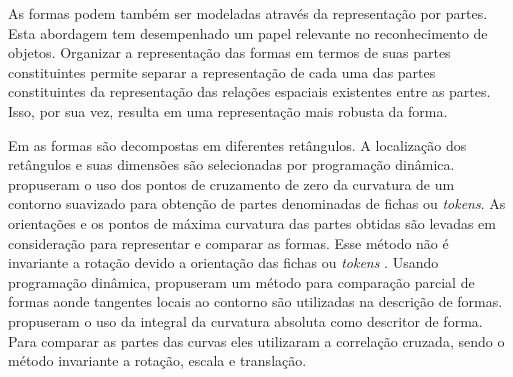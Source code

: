 As formas podem também ser modeladas através da representação por partes. Esta abordagem tem desempenhado um papel relevante no reconhecimento de objetos. Organizar a representação das formas em termos de suas partes constituintes permite separar a representação de cada uma das partes constituintes da representação das relações espaciais existentes entre as partes. Isso, por sua vez, resulta em uma representação mais robusta da forma. 

Em \cite{Kenji:1992} as formas são decompostas em diferentes retângulos. A localização dos retângulos e suas dimensões são selecionadas por programação dinâmica.  propuseram o uso dos pontos de cruzamento de zero da curvatura de um contorno suavizado para obtenção de partes denominadas de fichas ou \textit{tokens}. As orientações e os pontos de máxima curvatura das partes obtidas são levadas em consideração para representar e comparar as formas. Esse método não é invariante a rotação devido a orientação das fichas ou \textit{tokens} \cite{DiRuberto:2009}. Usando programação dinâmica,  propuseram um método para comparação parcial de formas aonde tangentes locais ao contorno são utilizadas na descrição de formas.  propuseram o uso da integral da curvatura absoluta como descritor de forma. Para comparar as partes das curvas eles utilizaram a correlação cruzada, sendo o método invariante a rotação, escala e translação.  



